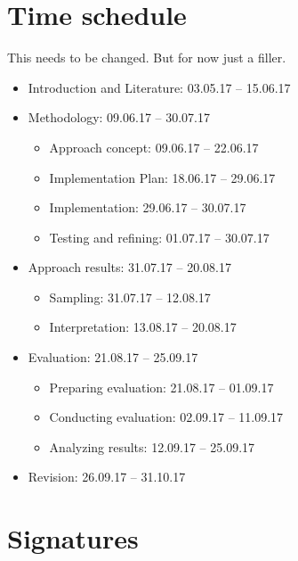 \documentclass[a4paper, 11pt]{article}
\begin{document}

\section{Time schedule}

This needs to be changed. But for now just a filler.

\begin{itemize}
	\item Introduction and Literature: 03.05.17 – 15.06.17
	\item Methodology: 09.06.17 – 30.07.17
	\begin{itemize}
		\item Approach concept: 09.06.17 – 22.06.17
		\item Implementation Plan: 18.06.17 – 29.06.17
        \item Implementation: 29.06.17 – 30.07.17
        \item Testing and refining: 01.07.17 – 30.07.17
	\end{itemize}
	\item Approach results: 31.07.17 – 20.08.17
	\begin{itemize}
		\item Sampling: 31.07.17 – 12.08.17
		\item Interpretation: 13.08.17 – 20.08.17
	\end{itemize}
	\item Evaluation: 21.08.17 – 25.09.17
	\begin{itemize}
		\item Preparing evaluation: 21.08.17 – 01.09.17
		\item Conducting evaluation: 02.09.17 – 11.09.17
		\item Analyzing results: 12.09.17 – 25.09.17
	\end{itemize}
	\item Revision: 26.09.17 – 31.10.17
\end{itemize}




\newpage
\section{Signatures}
\end{document}
